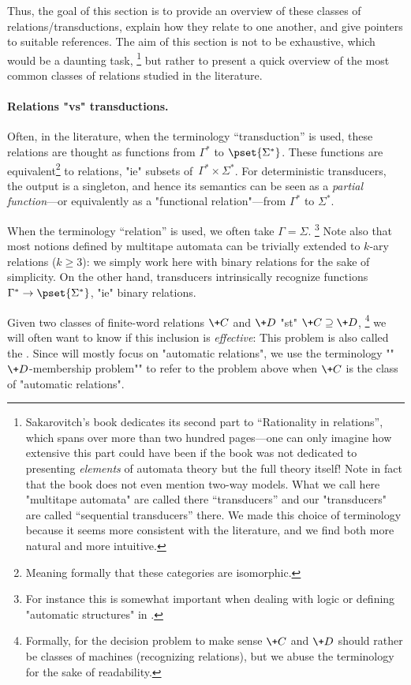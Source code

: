 Thus, the goal of this section is to provide an overview of these classes of relations/transductions, explain how they relate to one another, and give pointers to suitable references.
The aim of this section is not to be exhaustive, which would be a daunting task,%
\footnote{Sakarovitch's book \cite{Sakarovitch2009Elements}
dedicates its second part to ``Rationality in relations'', which spans over more than two hundred pages---one can only imagine how extensive this part could have been if the book was not
dedicated to presenting \emph{elements} of automata theory but the full theory itself!
Note in fact that the book does not even mention two-way models.
What we call here "multitape automata" are called there ``transducers''
and our "transducers" are called ``sequential transducers'' there.
We made this choice of terminology because it seems more consistent with
the literature, and we find both more natural and more intuitive.}
but rather to present a quick overview of the most common classes of relations
studied in the literature.

\paragraph*{Relations "vs" transductions.}
Often, in the literature, when the terminology ``transduction'' is used,
these relations are thought as functions from $\Gamma^*$ to $\pset{\Sigma^*}$.
These functions are equivalent\footnote{Meaning formally that these categories are isomorphic.}
to relations, "ie" subsets of~$\Gamma^* \times \Sigma^*$.
For deterministic transducers, the output is a singleton, and hence its semantics can be seen
as a \emph{partial function}---or equivalently as a "functional relation"---from $\Gamma^*$ to $\Sigma^*$.

When the terminology ``relation'' is used,
we often take $\Gamma = \Sigma$.%
\footnote{For instance this is somewhat important when
dealing with logic or defining "automatic structures"
in .}
Note also that most notions defined by multitape automata
can be trivially extended to $k$-ary relations ($k \geq 3$):
we simply work here with binary relations for the sake of simplicity.
On the other hand, transducers intrinsically recognize functions $\Gamma^* \to \pset{\Sigma^*}$,
"ie" binary relations.

Given two classes of finite-word relations $\+C$ and $\+D$ "st" $\+C \supseteq \+D$,%
\footnote{Formally, for the decision problem to make sense $\+C$ and $\+D$ should rather be
classes of machines (recognizing relations),
but we abuse the terminology for the sake of readability.}
we will often want to know if this inclusion is \emph{effective}:
This problem is also called the .
Since  will mostly focus on "automatic relations",
we use the terminology \AP""$\+D$-membership problem"" to refer 
to the problem above when $\+C$ is the class of "automatic relations".

